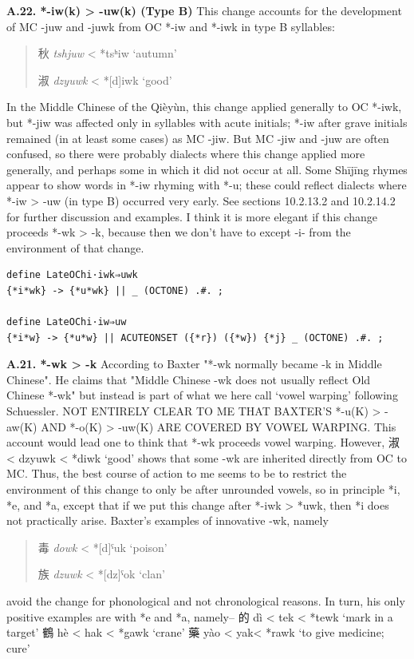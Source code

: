 \documentclass[xetex, svgnames, 12pt]{scrartcl}
\newcounter{para}
\newcommand\mypara[1]{\par\refstepcounter{para}\textbf{\thepara\space#1\space}}
\begin{document}
\mypara{A.22. *-iw(k) > -uw(k) (Type B)}
 This change accounts for the development of MC -juw and -juwk from OC *-iw and *-iwk
 in type B syllables: 
 \begin{quote}
 秋 %
 \textit{tshjuw} < *tsʰiw `autumn'

 淑 %
 \textit{dzyuwk} < *[d]iwk `good'
 \end{quote}
In the Middle Chinese of the Qièyùn, this change applied generally to OC *-iwk, but *-jiw
 was affected only in syllables with acute initials; *-iw after grave initials remained (in at
 least some cases) as MC -jiw. But MC -jiw and -juw are often confused, so there were
 probably dialects where this change applied more generally, and perhaps some in which it
 did not occur at all. Some Shījīng rhymes appear to show words in *-iw rhyming with *-u;
 these could reflect dialects where *-iw > -uw (in type B) occurred very early. See sections 10.2.13.2
 and 10.2.14.2 for further discussion and examples.
 I think it is more elegant if this change proceeds *-wk > -k, because then we don't have to
 except -i- from the environment of that change. 

\begin{verbatim}
define LateOChi·iwk⇒uwk 
{*i*wk} -> {*u*wk} || _ (OCTONE) .#. ;

define LateOChi·iw⇒uw 
{*i*w} -> {*u*w} || ACUTEONSET ({*r}) ({*w}) {*j} _ (OCTONE) .#. ;
\end{verbatim}

\mypara{A.21. *-wk > -k}
 According to Baxter "*-wk normally became -k in Middle Chinese". He claims that 
 "Middle Chinese -wk does not usually reflect Old Chinese *-wk" but instead is part
 of what we here call `vowel warping' following Schuessler. NOT ENTIRELY CLEAR TO 
 ME THAT BAXTER'S *-u(K) > -aw(K) AND *-o(K) > -uw(K) ARE COVERED BY VOWEL WARPING.
 This account would lead one to think that *-wk proceeds vowel warping. However, 
 淑 < dzyuwk < *diwk `good' shows that some -wk are inherited directly from OC to MC. 
 Thus, the best course of action to me seems to be to restrict the environment of this
 change to only be after unrounded vowels, so in principle *i, *e, and *a, except that 
 if we put this change after *-iwk > *uwk, then *i does not practically arise. Baxter's 
 examples of innovative -wk, namely 
 \begin{quote}
 毒 %
 \textit{dowk} < *[d]ˤuk `poison'

 族 %
 \textit{dzuwk} < *[dz]ˤok `clan'
 \end{quote}
 avoid the change for phonological and not chronological reasons. In turn, his only 
 positive examples are with *e and *a, namely-- 
 的 dì < tek < *tewk `mark in a target'
 鶴 hè < hak < *gawk `crane'
 藥 yào < yak< *rawk `to give medicine; cure'
 
\end{document}
